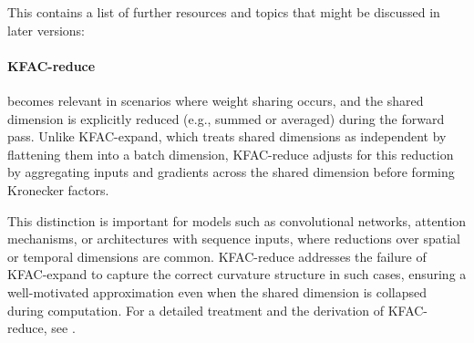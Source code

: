 This contains a list of further resources and topics that might be discussed in later versions:

\paragraph{KFAC-reduce} becomes relevant in scenarios where weight sharing occurs, and the shared dimension is explicitly reduced (e.g., summed or averaged) during the forward pass. Unlike KFAC-expand, which treats shared dimensions as independent by flattening them into a batch dimension, KFAC-reduce adjusts for this reduction by aggregating inputs and gradients across the shared dimension before forming Kronecker factors.

This distinction is important for models such as convolutional networks, attention mechanisms, or architectures with sequence inputs, where reductions over spatial or temporal dimensions are common. KFAC-reduce addresses the failure of KFAC-expand to capture the correct curvature structure in such cases, ensuring a well-motivated approximation even when the shared dimension is collapsed during computation. For a detailed treatment and the derivation of KFAC-reduce, see \citet{eschenhagen2023kroneckerfactored}.